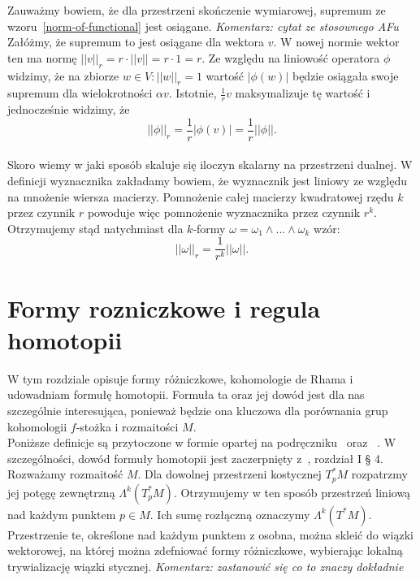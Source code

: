 \documentclass[licencjacka]{pracamgr}
\theoremstyle{definition}
\theoremstyle{definition}
\theoremstyle{plain}
\theoremstyle{plain}
\theoremstyle{plain}
\theoremstyle{plain}
\begin{document}
Zauważmy bowiem, że dla przestrzeni skończenie wymiarowej, supremum
ze wzoru~\ref{norm-of-functional} jest osiągane. 
\emph{Komentarz: cytat ze stosownego AFu}
Załóżmy, że supremum to jest osiągane dla wektora $v$. W nowej normie wektor
ten ma normę $|| v ||_r = r \cdot || v || = r \cdot 1 = r$. Ze względu
na liniowość operatora $\phi$ widzimy, że na zbiorze ${w \in V: ||w||_r = 1}$
wartość $| \phi (w) |$ będzie osiągała swoje supremum dla wielokrotności
$\alpha v$. Istotnie, $\frac{1}{r} v$ maksymalizuje tę wartość i 
jednocześnie widzimy, że 
\[
||\phi||_r = \frac{1}{r} |\phi(v)| = \frac{1}{r}|| \phi ||.
\]  \\

Skoro wiemy w jaki sposób skaluje się iloczyn skalarny na przestrzeni dualnej.
W definicji wyznacznika zakładamy bowiem, że wyznacznik jest liniowy ze względu
na mnożenie wiersza macierzy. Pomnożenie całej macierzy kwadratowej rzędu $k$
przez czynnik $r$ powoduje więc pomnożenie wyznacznika przez czynnik $r^k$.
Otrzymujemy stąd natychmiast dla $k$-formy $\omega = \omega_1 \wedge ... \wedge
\omega_k$  wzór:
\begin{equation}\label{scaling-of-norm}
|| \omega ||_r = \frac{1}{r^k} || \omega ||.
\end{equation}


\chapter{Formy rozniczkowe i regula homotopii}
W tym rozdziale opisuje formy różniczkowe, kohomologie de Rhama i udowadniam 
formułę homotopii. Formuła ta oraz jej dowód jest dla nas szczególnie
interesująca, ponieważ będzie ona kluczowa dla porównania grup
kohomologii $f$-stożka i rozmaitości $M$. \\

Poniższe definicje są przytoczone w formie opartej na podręczniku~\cite{lee}
oraz ~\cite{bott}. W szczególności, dowód formuły homotopii jest zaczerpnięty
z~\cite{bott}, rozdział I § 4. \\

Rozważamy rozmaitość $M$. Dla dowolnej przestrzeni kostycznej 
$T_p^\ast M$ rozpatrzmy jej potęgę zewnętrzną $\Lambda^k(T_p^\ast M)$.
Otrzymujemy w ten sposób przestrzeń liniową nad każdym punktem $p \in M$.
Ich sumę rozłączną oznaczymy $\Lambda^k(T^\ast M)$. Przestrzenie te,
określone nad każdym punktem z osobna, można skleić do wiązki wektorowej, na
której można zdefniować formy różniczkowe, wybierając lokalną
trywializację wiązki stycznej. \emph{Komentarz: zastanowić się co to znaczy
dokładnie} \\
\end{document}
